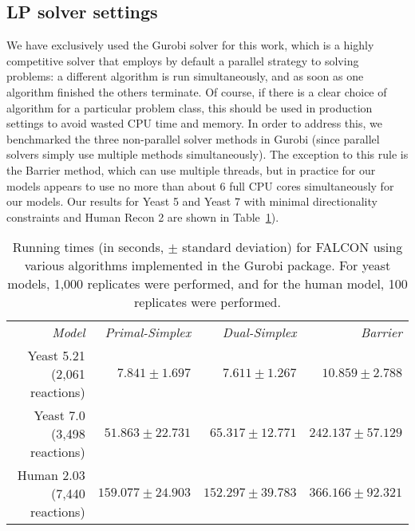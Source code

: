 
\subsection{LP solver settings}
\label{ssec:lpsettings}
We have exclusively used the Gurobi solver \citep{gurobi} for this
work, which is a highly competitive solver that employs by default a
parallel strategy to solving problems: a different algorithm is run
simultaneously, and as soon as one algorithm finished the others
terminate. Of course, if there is a clear choice of algorithm for a
particular problem class, this should be used in production settings
to avoid wasted CPU time and memory. In order to address this, we
benchmarked the three non-parallel solver methods in Gurobi
 (since parallel solvers simply use multiple methods simultaneously).
The exception to this rule is the Barrier method, which can use
multiple threads, but in practice for our models appears to use
no more than about 6 full CPU cores simultaneously for our models.
Our results for Yeast 5 and Yeast 7 with minimal directionality constraints
\citep{Heavner2012,Lee2012,Aung2013} and Human Recon 2 \citep{Thiele2013}
are shown in Table~\ref{tab:methodTime}).

\begin{table}
\begin{center}
\begin{tabular}{rrrr}
\emph{Model}                 & \emph{Primal-Simplex} & \emph{Dual-Simplex} & \emph{Barrier} \\
Yeast 5.21 (2,061 reactions) & $ 7.841 \pm 1.697    $ & $ 7.611 \pm 1.267    $ & $ 10.859 \pm 2.788   $\\ 
Yeast 7.0 (3,498 reactions)  & $ 51.863 \pm 22.731  $ & $ 65.317 \pm 12.771  $ & $ 242.137 \pm 57.129 $\\
Human 2.03 (7,440 reactions) & $ 159.077 \pm 24.903 $ & $ 152.297 \pm 39.783 $ & $ 366.166 \pm 92.321 $\\
\end{tabular}
\end{center}
\caption{Running times (in seconds, $\pm$ standard deviation) for
  FALCON using various algorithms implemented in the Gurobi package.
  For yeast models, 1,000 replicates were performed, and for the human
  model, 100 replicates were performed.}
\label{tab:methodTime}
\end{table}

